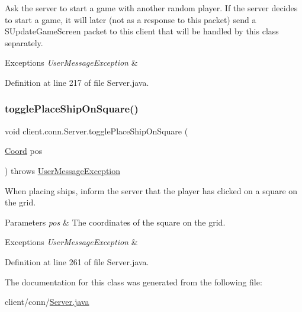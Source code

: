 Ask the server to start a game with another random player. If the server decides to start a game, it will later (not as a response to this packet) send a S\+Update\+Game\+Screen packet to this client that will be handled by this class separately. 
\begin{DoxyExceptions}{Exceptions}
{\em User\+Message\+Exception} & \\
\hline
\end{DoxyExceptions}


Definition at line 217 of file Server.\+java.

\hypertarget{classclient_1_1conn_1_1_server_a9894c54137e6f203dd38a47fe3514c27}{}\label{classclient_1_1conn_1_1_server_a9894c54137e6f203dd38a47fe3514c27} 
\subsubsection{\texorpdfstring{toggle\+Place\+Ship\+On\+Square()}{togglePlaceShipOnSquare()}}
{\footnotesize\ttfamily void client.\+conn.\+Server.\+toggle\+Place\+Ship\+On\+Square (\begin{DoxyParamCaption}\item[{\hyperlink{classsharedlib_1_1utils_1_1_coord}{Coord}}]{pos }\end{DoxyParamCaption}) throws \hyperlink{classsharedlib_1_1exceptions_1_1_user_message_exception}{User\+Message\+Exception}}

When placing ships, inform the server that the player has clicked on a square on the grid. 
\begin{DoxyParams}{Parameters}
{\em pos} & The coordinates of the square on the grid. \\
\hline
\end{DoxyParams}

\begin{DoxyExceptions}{Exceptions}
{\em User\+Message\+Exception} & \\
\hline
\end{DoxyExceptions}


Definition at line 261 of file Server.\+java.



The documentation for this class was generated from the following file\+:\begin{DoxyCompactItemize}
\item 
client/conn/\hyperlink{_server_8java}{Server.\+java}\end{DoxyCompactItemize}
